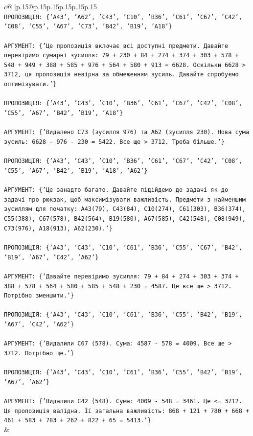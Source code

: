 \documentclass{article}
\begin{document}
{\begin{supertabular}{c@{$\;$}|p{.15\linewidth}@{}p{.15\linewidth}p{.15\linewidth}p{.15\linewidth}p{.15\linewidth}p{.15\linewidth}}
{{{\\ 
\texttt{ПРОПОЗИЦІЯ: \{'A43', 'A62', 'C43', 'C10', 'B36', 'C61', 'C67', 'C42', 'C08', 'C55', 'A67', 'C73', 'B42', 'B19', 'A18'\}} \\
\\ 
\texttt{АРГУМЕНТ: \{'Це пропозиція включає всі доступні предмети. Давайте перевіримо сумарні зусилля: 79 + 230 + 84 + 274 + 374 + 303 + 578 + 548 + 949 + 388 + 585 + 976 + 564 + 580 + 913 = 6628. Оскільки 6628 > 3712, ця пропозиція невірна за обмеженням зусиль. Давайте спробуємо оптимізувати.'\}} \\
\\ 
\texttt{ПРОПОЗИЦІЯ: \{'A43', 'C43', 'C10', 'B36', 'C61', 'C67', 'C42', 'C08', 'C55', 'A67', 'B42', 'B19', 'A18'\}} \\
\\ 
\texttt{АРГУМЕНТ: \{'Видалено C73 (зусилля 976) та A62 (зусилля 230). Нова сума зусиль: 6628 {-} 976 {-} 230 = 5422. Все ще > 3712. Треба більше.'\}} \\
\\ 
\texttt{ПРОПОЗИЦІЯ: \{'A43', 'C43', 'C10', 'B36', 'C61', 'C67', 'C42', 'C08', 'C55', 'A67', 'B42', 'B19', 'A18', 'A62'\}} \\
\\ 
\texttt{АРГУМЕНТ: \{'Це занадто багато. Давайте підійдемо до задачі як до задачі про рюкзак, щоб максимізувати важливість. Предмети з найменшим зусиллям для початку: A43(79), C43(84), C10(274), C61(303), B36(374), C55(388), C67(578), B42(564), B19(580), A67(585), C42(548), C08(949), C73(976), A18(913), A62(230).'\}} \\
\\ 
\texttt{ПРОПОЗИЦІЯ: \{'A43', 'C43', 'C10', 'C61', 'B36', 'C55', 'C67', 'B42', 'B19', 'A67', 'C42', 'A62'\}} \\
\\ 
\texttt{АРГУМЕНТ: \{'Давайте перевіримо зусилля: 79 + 84 + 274 + 303 + 374 + 388 + 578 + 564 + 580 + 585 + 548 + 230 = 4587. Це все ще > 3712. Потрібно зменшити.'\}} \\
\\ 
\texttt{ПРОПОЗИЦІЯ: \{'A43', 'C43', 'C10', 'C61', 'B36', 'C55', 'B42', 'B19', 'A67', 'C42', 'A62'\}} \\
\\ 
\texttt{АРГУМЕНТ: \{'Видалили C67 (578). Сума: 4587 {-} 578 = 4009. Все ще > 3712. Потрібно ще.'\}} \\
\\ 
\texttt{ПРОПОЗИЦІЯ: \{'A43', 'C43', 'C10', 'C61', 'B36', 'C55', 'B42', 'B19', 'A67', 'A62'\}} \\
\\ 
\texttt{АРГУМЕНТ: \{'Видалили C42 (548). Сума: 4009 {-} 548 = 3461. Це <= 3712. Ця пропозиція валідна. Її загальна важливість: 868 + 121 + 780 + 668 + 461 + 583 + 783 + 262 + 822 + 65 = 5413.'\}} \\
            }
        }
    }
    & \\ \\


\end{supertabular}}
\end{document}
